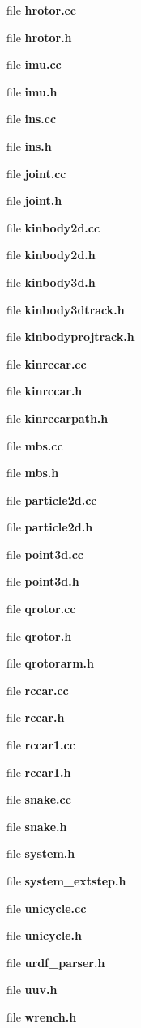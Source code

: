 \begin{DoxyCompactItemize}
file {\bf hrotor.\-cc}
\item 
file {\bf hrotor.\-h}
\item 
file {\bf imu.\-cc}
\item 
file {\bf imu.\-h}
\item 
file {\bf ins.\-cc}
\item 
file {\bf ins.\-h}
\item 
file {\bf joint.\-cc}
\item 
file {\bf joint.\-h}
\item 
file {\bf kinbody2d.\-cc}
\item 
file {\bf kinbody2d.\-h}
\item 
file {\bf kinbody3d.\-h}
\item 
file {\bf kinbody3dtrack.\-h}
\item 
file {\bf kinbodyprojtrack.\-h}
\item 
file {\bf kinrccar.\-cc}
\item 
file {\bf kinrccar.\-h}
\item 
file {\bf kinrccarpath.\-h}
\item 
file {\bf mbs.\-cc}
\item 
file {\bf mbs.\-h}
\item 
file {\bf particle2d.\-cc}
\item 
file {\bf particle2d.\-h}
\item 
file {\bf point3d.\-cc}
\item 
file {\bf point3d.\-h}
\item 
file {\bf qrotor.\-cc}
\item 
file {\bf qrotor.\-h}
\item 
file {\bf qrotorarm.\-h}
\item 
file {\bf rccar.\-cc}
\item 
file {\bf rccar.\-h}
\item 
file {\bf rccar1.\-cc}
\item 
file {\bf rccar1.\-h}
\item 
file {\bf snake.\-cc}
\item 
file {\bf snake.\-h}
\item 
file {\bf system.\-h}
\item 
file {\bf system\-\_\-extstep.\-h}
\item 
file {\bf unicycle.\-cc}
\item 
file {\bf unicycle.\-h}
\item 
file {\bf urdf\-\_\-parser.\-h}
\item 
file {\bf uuv.\-h}
\item 
file {\bf wrench.\-h}
\end{DoxyCompactItemize}
